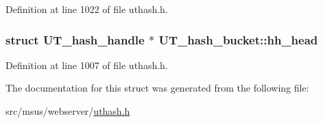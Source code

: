 Definition at line 1022 of file uthash.\-h.

\hypertarget{struct_u_t__hash__bucket_aff0ef60d2d1fabbfdd092b1ae9d00422}{
\subsubsection[{hh\-\_\-head}]{\setlength{\rightskip}{0pt plus 5cm}struct {\bf U\-T\-\_\-hash\-\_\-handle} $\ast$ U\-T\-\_\-hash\-\_\-bucket\-::hh\-\_\-head}}\label{struct_u_t__hash__bucket_aff0ef60d2d1fabbfdd092b1ae9d00422}


Definition at line 1007 of file uthash.\-h.



The documentation for this struct was generated from the following file\-:\begin{DoxyCompactItemize}
\item 
src/msus/webserver/\hyperlink{msus_2webserver_2uthash_8h}{uthash.\-h}\end{DoxyCompactItemize}
